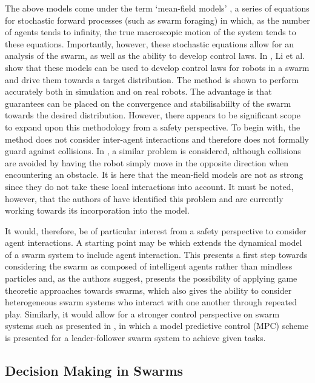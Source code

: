 \documentclass[.../main.tex]{subfiles}
\begin{document}
The above models come under the term ‘mean-field models’ \cite{Elamvazhuthi2019b}, a series of
equations for stochastic forward processes (such as swarm foraging) in which, as the number of
agents tends to infinity, the true macroscopic motion of the system tends to these equations.
Importantly, however, these stochastic equations allow for an analysis of the swarm, as well as the
ability to develop control laws. In \cite{Li2017}, Li et al. show that these models can be used to
develop control laws for robots in a swarm and drive them towards a target distribution. The method
is shown to perform accurately both in simulation and on real robots. The advantage is that
guarantees can be placed on the convergence and stabilisabiilty of the swarm towards the desired
distribution. However, there appears to be significant scope to expand upon this methodology from a
safety perspective. To begin with, the method does not consider inter-agent interactions and
therefore does not formally guard against collisions. In \cite{Inoue2019}, a similar problem is
considered, although collisions are avoided by having the robot simply move in the opposite
direction when encountering an obstacle. It is here that the mean-field models are not as strong
since they do not take these local interactions into account. It must be noted, however, that the
authors of \cite{Inoue2019} have identified this problem and are currently working towards its
incorporation into the model.

It would, therefore, be of particular interest from a safety perspective to consider agent
interactions. A starting point may be \cite{Bellomo2017} which extends the dynamical model of a
swarm system to include agent interaction. This presents a first step towards considering the swarm
as composed of intelligent agents rather than mindless particles and, as the authors suggest,
presents the possibility of applying game theoretic approaches towards swarms, which also gives the
ability to consider heterogeneous swarm systems who interact with one another through repeated play.
Similarly, it would allow for a stronger control perspective on swarm systems such as presented in
\cite{Borzi2015}, in which a model predictive control (MPC) scheme is presented for a
leader-follower swarm system to achieve given tasks. 


\subsection{Decision Making in Swarms} \label{sec::Decisions_in_Swarms}
\end{document}
